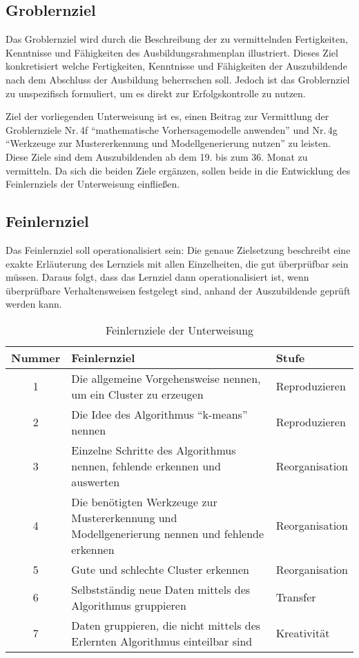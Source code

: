 \subsection{Groblernziel}
Das Groblernziel wird durch die Beschreibung der zu vermittelnden Fertigkeiten, Kenntnisse und Fähigkeiten des Ausbildungsrahmenplan illustriert. Dieses Ziel konkretisiert welche Fertigkeiten, Kenntnisse und Fähigkeiten der Auszubildende nach dem Abschluss der Ausbildung beherrschen soll. Jedoch ist das Groblernziel zu unspezifisch formuliert, um es direkt zur Erfolgskontrolle zu nutzen. 
\par
Ziel der vorliegenden Unterweisung ist es, einen Beitrag zur Vermittlung der Groblernziele Nr.\,4f \enquote{mathematische Vorhersagemodelle anwenden} und Nr.\,4g \enquote{Werkzeuge zur Mustererkennung und Modellgenerierung nutzen} zu leisten. Diese Ziele sind dem Auszubildenden ab dem 19. bis zum 36. Monat zu vermitteln. Da sich die beiden Ziele ergänzen, sollen beide in die Entwicklung des Feinlernziels der Unterweisung einfließen. 
 
\subsection{Feinlernziel}
Das Feinlernziel soll operationalisiert sein: Die genaue Zielsetzung beschreibt eine exakte Erläuterung des Lernziels mit allen Einzelheiten, die gut überprüfbar sein müssen. Daraus folgt, dass das Lernziel dann operationalisiert ist, wenn überprüfbare Verhaltensweisen festgelegt sind, anhand der Auszubildende geprüft werden kann. 

\begin{table}[h!]
	\centering
	
	\begin{tabular}{@{}cp{8.0cm}l@{}}
		\toprule
		\textbf{Nummer} & \textbf{Feinlernziel} & \textbf{Stufe} \\ \midrule
		1 & Die allgemeine Vorgehensweise nennen, um ein Cluster zu erzeugen & Reproduzieren\\
		2 & Die Idee des Algorithmus \enquote{k-means} nennen & Reproduzieren \\
		3 & Einzelne Schritte des Algorithmus nennen, fehlende erkennen und auswerten & Reorganisation \\
		4 & Die benötigten Werkzeuge zur Mustererkennung und Modellgenerierung nennen und fehlende erkennen & Reorganisation \\ 
		5 & Gute und schlechte Cluster erkennen & Reorganisation \\
		6 & Selbstständig neue Daten mittels des Algorithmus gruppieren & Transfer \\ 
		7 & Daten gruppieren, die nicht mittels des Erlernten Algorithmus einteilbar sind & Kreativität\\ 

		\bottomrule
	\end{tabular}

	\caption{Feinlernziele der Unterweisung}
	\label{tab:lernziele}
\end{table}

